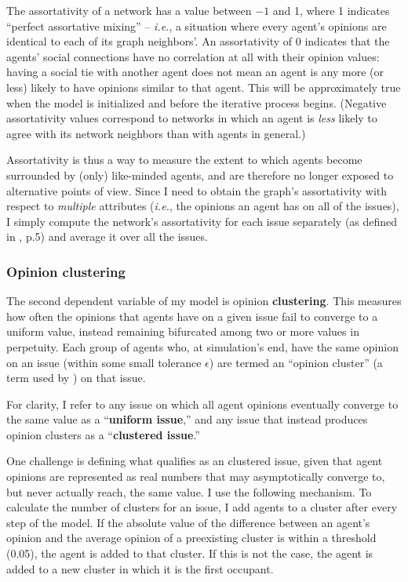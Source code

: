 The assortativity of a network has a value between $-1$ and 1, where 1
indicates ``perfect assortative mixing'' -- \textit{i.e.}, a situation where
every agent's opinions are identical to each of its graph neighbors'. An
assortativity of 0 indicates that the agents' social connections have no
correlation at all with their opinion values: having a social tie with another
agent does not mean an agent is any more (or less) likely to have opinions
similar to that agent. This will be approximately true when the model is
initialized and before the iterative process begins. (Negative assortativity
values correspond to networks in which an agent is \textit{less} likely to
agree with its network neighbors than with agents in general.)

Assortativity is thus a way to measure the extent to which agents become
surrounded by (only) like-minded agents, and are therefore no longer exposed to
alternative points of view. Since I need to obtain the graph's assortativity
with respect to \textit{multiple} attributes (\textit{i.e.}, the opinions an
agent has on all of the issues), I simply compute the network's assortativity
for each issue separately (as defined in \cite{newman_mixing_2003}, p.5) and
average it over all the issues.

\subsubsection{Opinion clustering}

The second dependent variable of my model is opinion \textbf{clustering}. This
measures how often the opinions that agents have on a given issue fail to
converge to a uniform value, instead remaining bifurcated among two or more
values in perpetuity. Each group of agents who, at simulation's end, have the
same opinion on an issue (within some small tolerance $\epsilon$) are termed an
``opinion cluster'' (a term used by \cite{fotakis_opinion_2016}) on that issue.

For clarity, I refer to any issue on which all agent opinions eventually
converge to the same value as a ``\textbf{uniform issue},'' and any issue that
instead produces opinion clusters as a ``\textbf{clustered issue}.''

One challenge is defining what qualifies as an clustered issue, given that
agent opinions are represented as real numbers that may asymptotically converge
to, but never actually reach, the same value. I use the following mechanism.
To calculate the number of clusters for an issue, I add agents to a cluster
after every step of the model. If the absolute value of the difference between
an agent's opinion and the average opinion of a preexisting cluster is within
a threshold (0.05), the agent is added to that cluster. If this is not the
case, the agent is added to a new cluster in which it is the first occupant.

